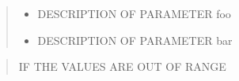 \documentclass[letterpaper,10pt,english]{sphinxmanual}
\begin{document}
\begin{fulllineitems}

\pysigstartsignatures
\pysigline
{}
\pysigstopsignatures\begin{quote}\begin{description}
\begin{itemize}
\item {} 
\sphinxAtStartPar
{} \sphinxhyphen{}\sphinxhyphen{} DESCRIPTION OF PARAMETER foo

\item {} 
\sphinxAtStartPar
{} \sphinxhyphen{}\sphinxhyphen{} DESCRIPTION OF PARAMETER bar

\end{itemize}

\end{description}\end{quote}

\end{fulllineitems}



\begin{fulllineitems}

\pysigstartsignatures
\pysiglinewithargsret
{}
{}
{}
\pysigstopsignatures\begin{quote}\begin{description}
\sphinxAtStartPar
{} \sphinxhyphen{}\sphinxhyphen{} IF THE VALUES ARE OUT OF RANGE

\end{description}\end{quote}

\end{fulllineitems}
\end{document}
